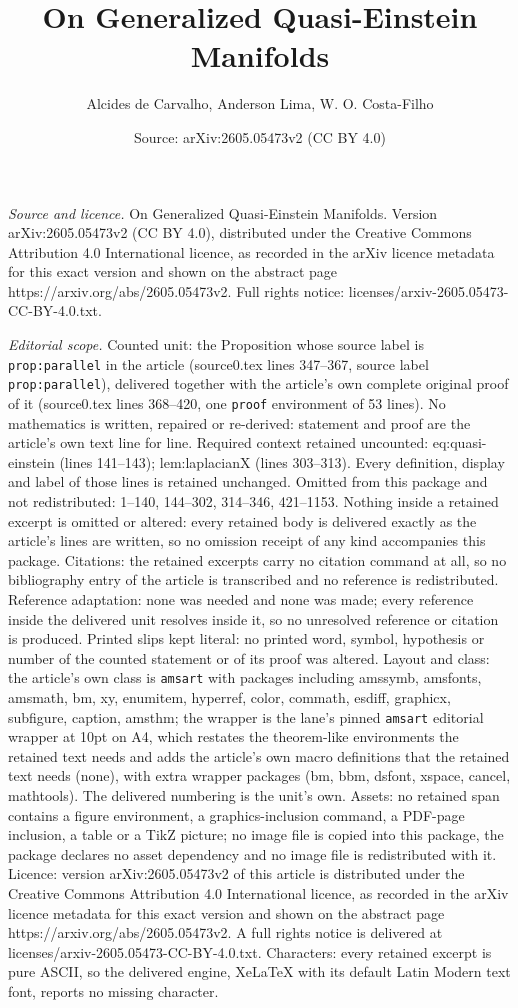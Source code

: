 \documentclass[10pt,a4paper]{amsart}
\title[On Generalized Quasi-Einstein Manifolds]{On Generalized Quasi-Einstein Manifolds}
\author{Alcides de Carvalho, Anderson Lima, W. O. Costa-Filho}
\date{Source: arXiv:2605.05473v2 (CC BY 4.0)}
\begin{document}
\maketitle

\noindent\emph{Source and licence.} On Generalized Quasi-Einstein Manifolds. Version arXiv:2605.05473v2 (CC BY 4.0), distributed under the Creative Commons Attribution 4.0 International licence, as recorded in the arXiv licence metadata for this exact version and shown on the abstract page https://arxiv.org/abs/2605.05473v2. Full rights notice: licenses/arxiv-2605.05473-CC-BY-4.0.txt.\par\smallskip

\noindent\textit{Editorial scope.} Counted unit: the Proposition whose source label is \texttt{prop:parallel} in the article (source0.tex lines 347--367, source label \texttt{prop:parallel}), delivered together with the article's own complete original proof of it (source0.tex lines 368--420, one \texttt{proof} environment of 53 lines). No mathematics is written, repaired or re-derived: statement and proof are the article's own text line for line. Required context retained uncounted: eq:quasi-einstein (lines 141--143); lem:laplacianX (lines 303--313). Every definition, display and label of those lines is retained unchanged. Omitted from this package and not redistributed: 1--140, 144--302, 314--346, 421--1153. Nothing inside a retained excerpt is omitted or altered: every retained body is delivered exactly as the article's lines are written, so no omission receipt of any kind accompanies this package. Citations: the retained excerpts carry no citation command at all, so no bibliography entry of the article is transcribed and no reference is redistributed. Reference adaptation: none was needed and none was made; every reference inside the delivered unit resolves inside it, so no unresolved reference or citation is produced. Printed slips kept literal: no printed word, symbol, hypothesis or number of the counted statement or of its proof was altered. Layout and class: the article's own class is \texttt{amsart} with packages including amssymb, amsfonts, amsmath, bm, xy, enumitem, hyperref, color, commath, esdiff, graphicx, subfigure, caption, amsthm; the wrapper is the lane's pinned \texttt{amsart} editorial wrapper at 10pt on A4, which restates the theorem-like environments the retained text needs and adds the article's own macro definitions that the retained text needs (none), with extra wrapper packages (bm, bbm, dsfont, xspace, cancel, mathtools). The delivered numbering is the unit's own. Assets: no retained span contains a figure environment, a graphics-inclusion command, a PDF-page inclusion, a table or a TikZ picture; no image file is copied into this package, the package declares no asset dependency and no image file is redistributed with it. Licence: version arXiv:2605.05473v2 of this article is distributed under the Creative Commons Attribution 4.0 International licence, as recorded in the arXiv licence metadata for this exact version and shown on the abstract page https://arxiv.org/abs/2605.05473v2. A full rights notice is delivered at licenses/arxiv-2605.05473-CC-BY-4.0.txt. Characters: every retained excerpt is pure ASCII, so the delivered engine, XeLaTeX with its default Latin Modern text font, reports no missing character.
\end{document}
